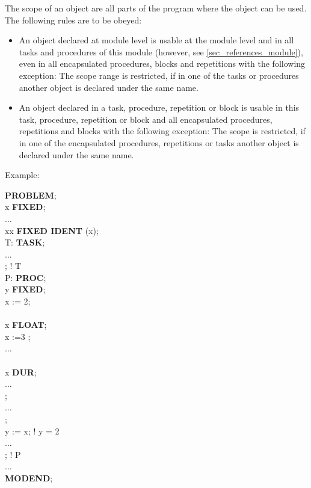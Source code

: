 The scope of an object are all parts of the program where the object can
be used. The following rules are to be obeyed:
\begin{itemize}
\item An object declared at module level is usable at the module level
and in all tasks and procedures of this module (however, see 
\ref{sec_references_module}), even
in all encapsulated procedures, blocks and repetitions with the
following exception: The scope range is restricted, if in one of the
tasks or procedures another object is declared under the same name.
\item An object declared in a task, procedure, repetition or block is
usable in this task, procedure, repetition or block and all
encapsulated procedures, repetitions and blocks with the following
exception: The scope is restricted, if in one of the encapsulated
procedures, repetitions or tasks another object is declared under the
same name.
\end{itemize}

Example:


{\bf PROBLEM};\\
 x {\bf FIXED};\\
\x ...\\
 xx {\bf FIXED IDENT} (x);\\
\x T: {\bf TASK};\\
\x \x ...\\
\x {}; ! T\\
\x P: {\bf PROC};\\
\x {} y {\bf FIXED};\\
\x \x x := 2;\\
\x {}\\
\x \x {} x {\bf FLOAT};\\
\x \x \x x :=3 ;\\
\x \x \x ...\\
\x \x {}\\
\x \x \x {} x {\bf DUR};\\
\x \x \x \x ...\\
\x \x {};\\
\x \x \x ...\\
\x {};\\
\x \x y := x; ! y = 2\\
\x \x ...\\
\x {}; ! P\\
\x ...\\
{\bf MODEND};

